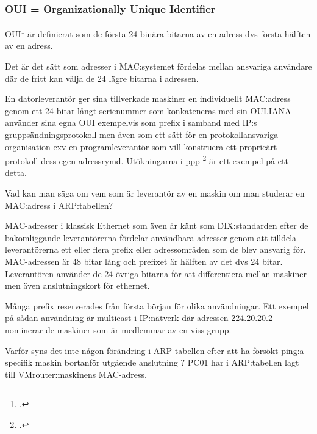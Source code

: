 \documentclass[swedish,10pt,a4paper]{article}
\begin{document}
\subsubsection{OUI = Organizationally Unique Identifier}
\label{subsubsec:oui}

OUI\footcite{rfc5342} är definierat som de första 24 binära bitarna av en adress dvs första
hälften av en adress.

Det är det sätt som adresser i MAC:systemet fördelas mellan ansvariga användare
där de fritt kan välja de 24 lägre bitarna i adressen.

En datorleverantör ger sina tillverkade maskiner en individuellt MAC:adress genom
ett 24 bitar långt serienummer som konkateneras med sin OUI.\@ IANA använder
sina egna OUI exempelvis som prefix i samband med IP:s gruppsändningsprotokoll men även
som ett sätt för en protokollansvariga organisation exv en programleverantör
som vill konstruera ett proprieärt protokoll dess egen adressrymd. Utökningarna i
ppp \footcite{rfc2153} är ett exempel på ett detta.


Vad kan man säga om vem som är leverantör av en maskin om man studerar en MAC:adress i ARP:tabellen?


MAC-adresser i klassisk Ethernet som även är känt som DIX:standarden efter
de bakomliggande leverantörerna fördelar användbara adresser genom att tilldela
leverantörerna ett eller flera prefix eller adressområden som de blev ansvarig för. MAC-adressen är 48 bitar lång
och prefixet är hälften av det dvs 24 bitar. Leverantören använder
de 24 övriga bitarna för att differentiera mellan maskiner men även anslutningskort för ethernet.

Många prefix reserverades från första början för olika användningar. Ett exempel på
sådan användning är multicast i IP:nätverk där adressen 224.20.20.2 nominerar
de maskiner som är medlemmar av en viss grupp.

Varför syns det inte någon förändring i ARP-tabellen efter att
ha försökt ping:a specifik maskin bortanför utgående anslutning ?
PC01 har i ARP:tabellen lagt till VMrouter:maskinens MAC-adress.
\end{document}
